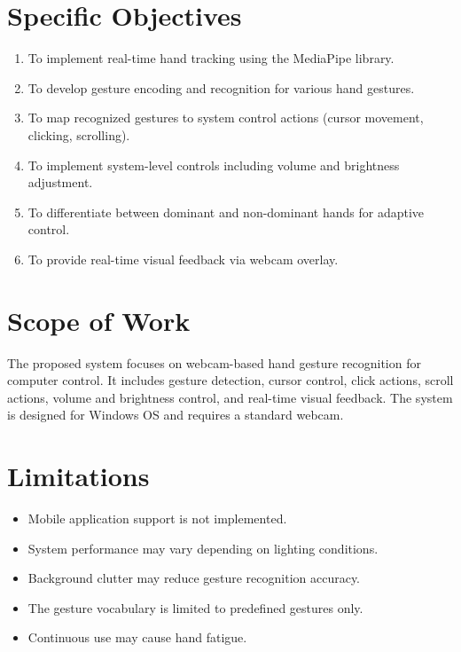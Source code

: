 \documentclass[12pt,a4paper]{report}
\begin{document}
\section{Specific Objectives}

\begin{enumerate}[noitemsep]
  \item To implement real-time hand tracking using the MediaPipe library.
  \item To develop gesture encoding and recognition for various hand gestures.
  \item To map recognized gestures to system control actions (cursor movement, clicking, scrolling).
  \item To implement system-level controls including volume and brightness adjustment.
  \item To differentiate between dominant and non-dominant hands for adaptive control.
  \item To provide real-time visual feedback via webcam overlay.
\end{enumerate}

\section{Scope of Work}

The proposed system focuses on webcam-based hand gesture recognition for computer control. It
includes gesture detection, cursor control, click actions, scroll actions, volume and brightness
control, and real-time visual feedback. The system is designed for Windows OS and requires a
standard webcam.

\section{Limitations}

\begin{itemize}[noitemsep]
  \item Mobile application support is not implemented.
  \item System performance may vary depending on lighting conditions.
  \item Background clutter may reduce gesture recognition accuracy.
  \item The gesture vocabulary is limited to predefined gestures only.
  \item Continuous use may cause hand fatigue.
\end{itemize}

\end{document}
